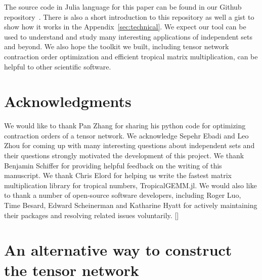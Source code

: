 \documentclass[onefignum, onetabnum]{siamart190516}
\newcommand{\<}{\langle}
\renewcommand{\>}{\rangle}
\newcommand{\blue}[1]{[{\bf  \color{blue}{JG: #1}}]}
\begin{document}
The source code in Julia language for this paper can be found in our Github repository~\cite{GraphTensorNetworks}. 
There is also a short introduction to this repository as well a gist to show how it works in the Appendix~\ref{sec:technical}.
We expect our tool can be used to understand and study many interesting applications of independent sets and beyond.
We also hope the toolkit we built, including tensor network contraction order optimization and efficient tropical matrix multiplication, can be helpful to other scientific software.


\section*{Acknowledgments}
We would like to thank Pan Zhang for sharing his python code for optimizing contraction orders of a tensor network.
We acknowledge Sepehr Ebadi and Leo Zhou for coming up with many interesting questions about independent sets and their questions strongly motivated the development of this project.
We thank Benjamin Schiffer for providing helpful feedback on the writing of this manuscript.
We thank Chris Elord for helping us write the fastest matrix multiplication library for tropical numbers, TropicalGEMM.jl. %
We would also like to thank a number of open-source software developers, including Roger Luo, Time Besard, Edward Scheinerman and Katharine Hyatt
for actively maintaining their packages and resolving related issues voluntarily.
\blue{funding information}




\appendix

\section{An alternative way to construct the tensor network}\label{sec:energymodel}
\end{document}
